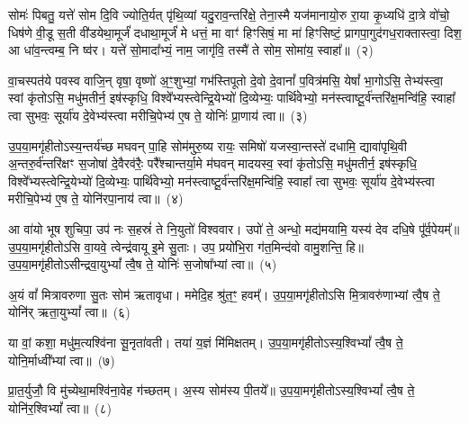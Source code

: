सोमः॑ पिबतु॒ यत्ते॑ सोम दि॒वि ज्योति॒र्यत् पृ॑थि॒व्यां यदु॒राव॒न्तरि॑क्षे॒ तेना॒स्मै यज॑मानायो॒रु रा॒या कृ॒ध्यधि॑ दा॒त्रे वो॑चो॒ धिष॑णे वी॒डू स॒ती वी॑डयेथा॒मूर्जं॑ दधाथा॒मूर्जं॑ मे धत्तं॒ मा वाꣳ॑ हिꣳसिषं॒ मा मा॑ हिꣳसिष्टं॒ प्रागपा॒गुद॑गध॒राक्तास्त्वा॒ दिश॒ आ धा॑व॒न्त्वम्ब॒ नि ष्व॑र। यत्ते॑ सो॒मादा᳚भ्यं॒ नाम॒ जागृ॑वि॒ तस्मै॑ ते सोम॒ सोमा॑य॒ स्वाहा᳚॥~(२)

{\anuvakamend[{यु॒ष्माकꣴ॑ स्वर॒ यत्ते॒ नव॑ च}]}%

वा॒चस्पत॑ये पवस्व वाजि॒न् वृषा॒ वृष्णो॑ अ॒ꣳ॒शुभ्यां॒ गभ॑स्तिपूतो दे॒वो दे॒वानां᳚ प॒वित्र॑मसि॒ येषां᳚ भा॒गो\-ऽसि॒ तेभ्य॑स्त्वा॒ स्वां कृ॑तो\-ऽसि॒ मधु॑मतीर्न॒ इष॑स्कृधि॒ विश्वे᳚भ्यस्त्वेन्द्रि॒येभ्यो॑ दि॒व्येभ्यः॒ पार्थि॑वेभ्यो॒ मन॑स्त्वाष्टू॒र्व॑न्त\-रि॑क्ष॒मन्वि॑हि॒ स्वाहा᳚ त्वा सुभवः॒ सूर्या॑य दे॒वेभ्य॑स्त्वा मरीचि॒पेभ्य॑ ए॒ष ते॒ योनिः॑ प्रा॒णाय॑ त्वा॥~(३)

{\anuvakamend[{वा॒चः स॒प्तच॑त्वारिꣳशत्}]}%

उ॒प॒या॒मगृ॑हीतो\-ऽस्य॒न्तर्य॑च्छ मघवन् पा॒हि सोम॑मुरु॒ष्य रायः॒ समिषो॑ यजस्वा॒न्तस्ते॑ दधामि॒ द्यावा॑\-पृथि॒वी अ॒न्तरु॒र्व॑न्तरि॑क्षꣳ स॒जोषा॑ दे॒वैरव॑रैः॒ परै᳚श्चान्तर्या॒मे म॑घवन् मादयस्व॒ स्वां कृ॑तो\-ऽसि॒ मधु॑मतीर्न॒ इष॑स्कृधि॒ विश्वे᳚भ्यस्त्वेन्द्रि॒येभ्यो॑ दि॒व्येभ्यः॒ पार्थि॑वेभ्यो॒ मन॑स्त्वाष्टू॒र्व॑न्त\-रि॑क्ष॒मन्वि॑हि॒ स्वाहा᳚ त्वा सुभवः॒ सूर्या॑य दे॒वेभ्य॑स्त्वा मरीचि॒पेभ्य॑ ए॒ष ते॒ योनि॑रपा॒नाय॑ त्वा॥~(४)

{\anuvakamend[{दे॒वेभ्यः॑ स॒प्त च॑}]}%

आ वा॑यो भूष शुचिपा॒ उप॑ नः स॒हस्रं॑ ते नि॒युतो॑ विश्ववार। उपो॑ ते॒ अन्धो॒ मद्य॑मयामि॒ यस्य॑ देव दधि॒षे पू᳚र्व॒पेयम्᳚॥ उ॒प॒या॒मगृ॑हीतो\-ऽसि वा॒यवे॒ त्वेन्द्र॑वायू इ॒मे सु॒ताः। उप॒ प्रयो॑भि॒रा ग॑त॒मिन्द॑वो वामु॒शन्ति॒ हि॥ उ॒प॒या॒मगृ॑हीतो\-ऽसीन्द्रवा॒यु\-भ्यां᳚ त्वै॒ष ते॒ योनिः॑ स॒जोषा᳚भ्यां त्वा॥~(५)

{\anuvakamend[{आ वा॑यो॒ त्रिच॑त्वारिꣳशत्}]}%

अ॒यं वां᳚ मित्रावरुणा सु॒तः सोम॑ ऋतावृधा। ममेदि॒ह श्रु॑त॒ꣳ॒ हवम्᳚। उ॒प॒या॒मगृ॑हीतो\-ऽसि मि॒त्रावरु॑णाभ्यां त्वै॒ष ते॒ योनि॑र् ऋता॒यु\-भ्यां᳚ त्वा॥~(६)

{\anuvakamend[{अ॒यं वां᳚ विꣳश॒तिः}]}%

या वां॒ कशा॒ मधु॑म॒त्यश्वि॑ना सू॒नृता॑वती। तया॑ य॒ज्ञं मि॑मिक्षतम्। उ॒प॒या॒मगृ॑हीतो\-ऽस्य॒श्वि\-भ्यां᳚ त्वै॒ष ते॒ योनि॒र्माध्वी᳚भ्यां त्वा॥~(७)

{\anuvakamend[{या वा॑म॒ष्टाद॑श}]}%

प्रा॒त॒र्युजौ॒ वि मु॑च्येथा॒मश्वि॑ना॒वेह ग॑च्छतम्। अ॒स्य सोम॑स्य पी॒तये᳚॥ उ॒प॒या॒मगृ॑हीतो\-ऽस्य॒श्वि\-भ्यां᳚ त्वै॒ष ते॒ योनि॑र॒श्वि\-भ्यां᳚ त्वा॥~(८)

